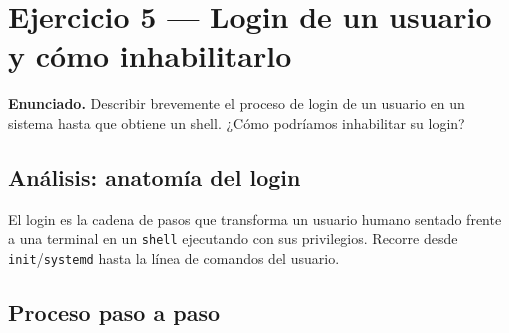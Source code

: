 \documentclass[11pt,a4paper]{article}
\begin{document}
\section{Ejercicio 5 --- Login de un usuario y cómo inhabilitarlo}

\textbf{Enunciado.} Describir brevemente el proceso de login de un
usuario en un sistema hasta que obtiene un shell. ¿Cómo podríamos
inhabilitar su login?

\subsection*{Análisis: anatomía del login}

El login es la cadena de pasos que transforma un usuario humano
sentado frente a una terminal en un \texttt{shell} ejecutando con
sus privilegios. Recorre desde \texttt{init}/\texttt{systemd} hasta
la línea de comandos del usuario.

\subsection*{Proceso paso a paso}
\end{document}
